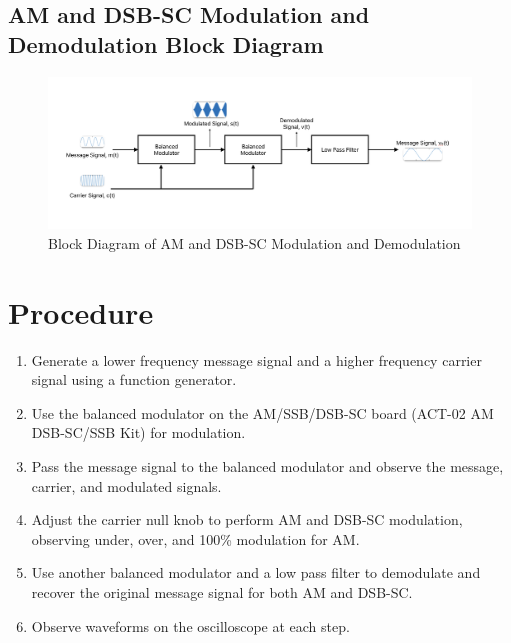 \documentclass[12pt]{article}
\begin{document}
\subsection*{AM and DSB-SC Modulation and Demodulation Block Diagram}
\begin{figure}[H]
    \centering
    \includegraphics[width=\textwidth]{bmb.png}
    \caption{Block Diagram of AM and DSB-SC Modulation and Demodulation}
    \label{fig:modulation_demodulation_block_diagram}
\end{figure}

\section*{Procedure}
\begin{enumerate}
    \item Generate a lower frequency message signal and a higher frequency carrier signal using a function generator.
    \item Use the balanced modulator on the AM/SSB/DSB-SC board (ACT-02 AM DSB-SC/SSB Kit) for modulation.
    \item Pass the message signal to the balanced modulator and observe the message, carrier, and modulated signals.
    \item Adjust the carrier null knob to perform AM and DSB-SC modulation, observing under, over, and 100\% modulation for AM.
    \item Use another balanced modulator and a low pass filter to demodulate and recover the original message signal for both AM and DSB-SC.
    \item Observe waveforms on the oscilloscope at each step.
\end{enumerate}
\end{document}
